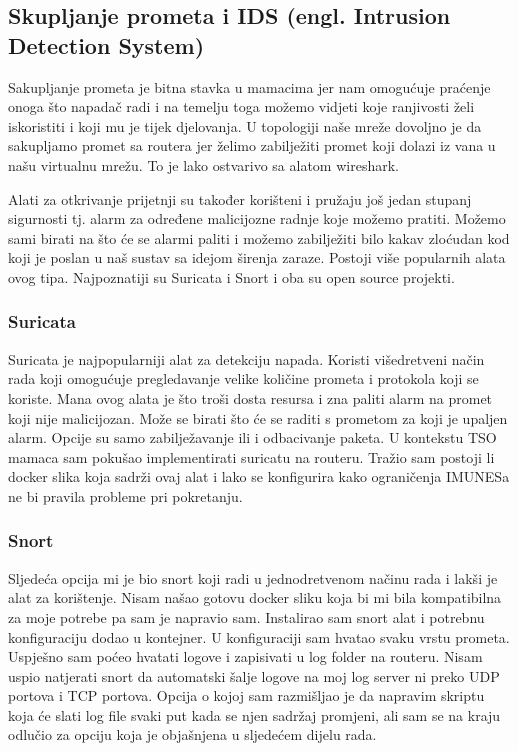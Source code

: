 \documentclass[times, utf8, zavrsni]{fer}
\begin{document}
\subsection{Skupljanje prometa i IDS (engl. Intrusion Detection System)}
Sakupljanje prometa je bitna stavka u mamacima jer nam omogućuje praćenje onoga što napadač radi i na temelju toga možemo vidjeti koje ranjivosti želi iskoristiti i koji mu je tijek djelovanja. U topologiji naše mreže dovoljno je da sakupljamo promet sa routera jer želimo zabilježiti promet koji dolazi iz vana u našu virtualnu mrežu. To je lako ostvarivo sa alatom wireshark.

Alati za otkrivanje prijetnji su također korišteni i pružaju još jedan stupanj sigurnosti tj. alarm za određene malicijozne radnje koje možemo pratiti. Možemo sami birati na što će se alarmi paliti i možemo zabilježiti bilo kakav zloćudan kod koji je poslan u naš sustav sa idejom širenja zaraze. Postoji više popularnih alata ovog tipa. Najpoznatiji su Suricata i Snort i oba su open source projekti.
\subsubsection{Suricata}
Suricata je najpopularniji alat za detekciju napada. Koristi višedretveni način rada koji omogućuje pregledavanje velike količine prometa i protokola koji se koriste. Mana ovog alata je što troši dosta resursa i zna paliti alarm na promet koji nije malicijozan. Može se birati što će se raditi s prometom za koji je upaljen alarm. Opcije su samo zabilježavanje ili i odbacivanje paketa. U kontekstu TSO mamaca sam pokušao implementirati suricatu na routeru. Tražio sam postoji li docker slika koja sadrži ovaj alat i lako se konfigurira kako ograničenja IMUNESa ne bi pravila probleme pri pokretanju. 
\subsubsection{Snort}
Sljedeća opcija mi je bio snort koji radi u jednodretvenom načinu rada i lakši je alat za korištenje. Nisam našao gotovu docker sliku koja bi mi bila kompatibilna za moje potrebe pa sam je napravio sam. Instalirao sam snort alat i potrebnu konfiguraciju dodao u kontejner. U konfiguraciji sam hvatao svaku vrstu prometa. Uspješno sam poćeo hvatati logove i zapisivati u log folder na routeru. Nisam uspio natjerati snort da automatski šalje logove na moj log server ni preko UDP portova i TCP portova. Opcija o kojoj sam razmišljao je da napravim skriptu koja će slati log file svaki put kada se njen sadržaj promjeni, ali sam se na kraju odlučio za opciju koja je objašnjena u sljedećem dijelu rada.
\end{document}
